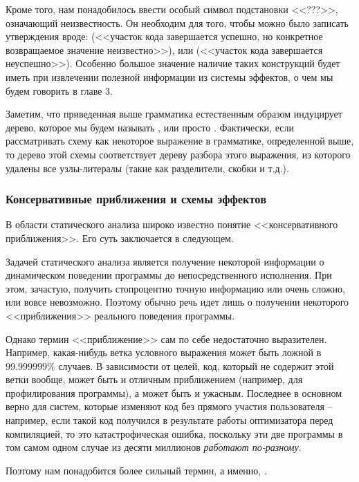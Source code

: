Кроме того, нам понадобилось ввести особый символ подстановки <<???>>, означающий неизвестность. Он необходим для того, чтобы можно было записать утверждения вроде:  (<<участок кода завершается успешно, но конкретное возвращаемое значение неизвестно>>), или  (<<участок кода завершается неуспешно>>). Особенно большое значение наличие таких конструкций будет иметь при извлечении полезной информации из системы эффектов, о чем мы будем говорить в главе 3.

Заметим, что приведенная выше грамматика естественным образом индуцирует дерево, которое мы будем называть , или просто . Фактически, если рассматривать схему как некоторое выражение в грамматике, определенной выше, то дерево этой схемы соответствует дереву разбора этого выражения, из которого удалены все узлы-литералы (такие как разделители, скобки и т.д.). 

\subsubsection{Консервативные приближения и схемы эффектов}

В области статического анализа широко известно понятие <<консервативного приближения>>. Его суть заключается в следующем. 

Задачей статического анализа является получение некоторой информации о динамическом поведении программы до непосредственного исполнения. При этом, зачастую, получить стопроцентно точную информацию или очень сложно, или вовсе невозможно. Поэтому обычно речь идет лишь о получении некоторого <<приближения>> реального поведения программы. 

Однако термин <<приближение>> сам по себе недостаточно выразителен. Например, какая-нибудь ветка условного выражения может быть ложной в $99.999999\%$ случаев. В зависимости от целей, код, который не содержит этой ветки вообще, может быть и отличным приближением (например, для профилирования программы), а может быть и ужасным. Последнее в основном верно для систем, которые изменяют код без прямого участия пользователя -- например, если такой код получился в результате работы оптимизатора перед компиляцией, то это катастрофическая ошибка, поскольку эти две программы в том самом одном случае из десяти миллионов \emph{работают по-разному}. 

Поэтому нам понадобится более сильный термин, а именно, .

